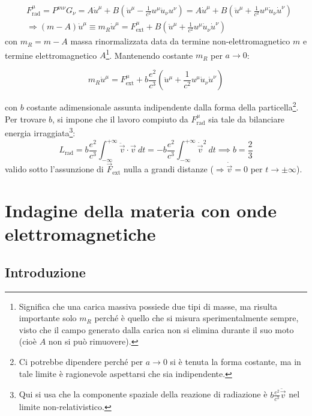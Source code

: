 \documentclass[10pt, a4paper]{scrartcl}
\numberwithin{equation}{subsection}
\theoremstyle{style1}
\newenvironment{boxenv}[1][]{
    \begin{eqbox}[#1]
    }{
   \end{eqbox}
}
\begin{document}
\begin{equation}
	\begin{split}
		&F^\mu _\text{rad}=P^{m\nu } G_\nu = A\dot{u}^\mu + B \left(\ddot{u}^\mu  - \frac{1}{c^2}u^\mu  \ddot{u}_\nu u^\nu \right) = A \dot{u}^\mu + B \left(\ddot{u}^\mu  + \frac{1}{c^2}u^\mu \dot{u}_\nu \dot{u}^\nu  \right) \\
		&\Rightarrow (m-A) \dot{u}^\mu\equiv m_R \dot{u}^\mu   = F^\mu _\text{ext}+ B \left(\ddot{u}^\mu  + \frac{1}{c^2} u^\mu  \dot{u}_\nu \dot{u}^\nu \right) 
	\end{split}
\end{equation}
con $m_R = m-A$ massa rinormalizzata data da termine non-elettromagnetico $m$ e termine elettromagnetico $A$\footnote{Significa che una carica massiva possiede due tipi di masse, ma risulta importante solo $m_R$ perch\'e \`e quello che si misura sperimentalmente sempre, visto che il campo generato dalla carica non si elimina durante il suo moto (cio\`e $A$ non si pu\`o rimuovere).}. Mantenendo costante $m_R$ per $a\to 0$:
\begin{boxenv}[]
\begin{equation}
	m_R \dot{u}^\mu  = F^\mu _\text{ext} + b \frac{e^2}{c^3}\left(\ddot{u}^\mu  + \frac{1}{c^2} u^\mu  \dot{u}_\nu  \dot{u}^\nu \right) 
\end{equation}
\end{boxenv}
\noindent con $b$ costante adimensionale assunta indipendente dalla forma della particella\footnote{Ci potrebbe dipendere perch\'e per $a\to 0$ si \`e tenuta la forma costante, ma in tale limite \`e ragionevole aspettarsi che sia indipendente.}. Per trovare $b$, si impone che il lavoro compiuto da $F^\mu _\text{rad}$ sia tale da bilanciare energia irraggiata\footnote{Qui si usa che la componente spaziale della reazione di radiazione \`e $b \frac{e^2}{c^3}\ddot{\vec{v}}$ nel limite non-relativistico.}:
\begin{equation}
	L_\text{rad}= b \frac{e^2 }{c^3}\int_{-\infty} ^{+\infty} \ddot{\vec{v}}\cdot \vec{v}\ dt = - b \frac{e^2}{c^3}\int_{-\infty} ^{+\infty} \dot{\vec{v}}^2 \ dt \implies b = \frac{2}{3}
\end{equation}
valido sotto l'assunzione di $\vec{F}_\text{ext}$ nulla a grandi distanze ($\Rightarrow  \dot{\vec{v}}=0 $ per $ t\to \pm\infty$).
\newpage
\section{Indagine della materia con onde elettromagnetiche}
\subsection{Introduzione}
\end{document}
